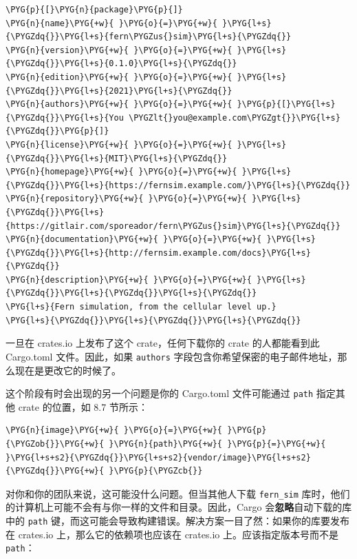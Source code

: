 \begin{Verbatim}[commandchars=\\\{\},breaklines=true,breakanywhere=true,fontsize=\codefont,xleftmargin=17bp]
\PYG{p}{[}\PYG{n}{package}\PYG{p}{]}
\PYG{n}{name}\PYG{+w}{ }\PYG{o}{=}\PYG{+w}{ }\PYG{l+s}{\PYGZdq{}}\PYG{l+s}{fern\PYGZus{}sim}\PYG{l+s}{\PYGZdq{}}
\PYG{n}{version}\PYG{+w}{ }\PYG{o}{=}\PYG{+w}{ }\PYG{l+s}{\PYGZdq{}}\PYG{l+s}{0.1.0}\PYG{l+s}{\PYGZdq{}}
\PYG{n}{edition}\PYG{+w}{ }\PYG{o}{=}\PYG{+w}{ }\PYG{l+s}{\PYGZdq{}}\PYG{l+s}{2021}\PYG{l+s}{\PYGZdq{}}
\PYG{n}{authors}\PYG{+w}{ }\PYG{o}{=}\PYG{+w}{ }\PYG{p}{[}\PYG{l+s}{\PYGZdq{}}\PYG{l+s}{You \PYGZlt{}you@example.com\PYGZgt{}}\PYG{l+s}{\PYGZdq{}}\PYG{p}{]}
\PYG{n}{license}\PYG{+w}{ }\PYG{o}{=}\PYG{+w}{ }\PYG{l+s}{\PYGZdq{}}\PYG{l+s}{MIT}\PYG{l+s}{\PYGZdq{}}
\PYG{n}{homepage}\PYG{+w}{ }\PYG{o}{=}\PYG{+w}{ }\PYG{l+s}{\PYGZdq{}}\PYG{l+s}{https://fernsim.example.com/}\PYG{l+s}{\PYGZdq{}}
\PYG{n}{repository}\PYG{+w}{ }\PYG{o}{=}\PYG{+w}{ }\PYG{l+s}{\PYGZdq{}}\PYG{l+s}{https://gitlair.com/sporeador/fern\PYGZus{}sim}\PYG{l+s}{\PYGZdq{}}
\PYG{n}{documentation}\PYG{+w}{ }\PYG{o}{=}\PYG{+w}{ }\PYG{l+s}{\PYGZdq{}}\PYG{l+s}{http://fernsim.example.com/docs}\PYG{l+s}{\PYGZdq{}}
\PYG{n}{description}\PYG{+w}{ }\PYG{o}{=}\PYG{+w}{ }\PYG{l+s}{\PYGZdq{}}\PYG{l+s}{\PYGZdq{}}\PYG{l+s}{\PYGZdq{}}
\PYG{l+s}{Fern simulation, from the cellular level up.}
\PYG{l+s}{\PYGZdq{}}\PYG{l+s}{\PYGZdq{}}\PYG{l+s}{\PYGZdq{}}
\end{Verbatim}

\begin{myNote}
一旦在 crates.io 上发布了这个 crate，任何下载你的 crate 的人都能看到此 Cargo.toml 文件。因此，如果 \texttt{authors} 字段包含你希望保密的电子邮件地址，那么现在是更改它的时候了。
\end{myNote}

这个阶段有时会出现的另一个问题是你的 Cargo.toml 文件可能通过 \texttt{path} 指定其他 crate 的位置，如 8.7 节所示：

\begin{Verbatim}[commandchars=\\\{\},breaklines=true,breakanywhere=true,fontsize=\codefont,xleftmargin=17bp]
\PYG{n}{image}\PYG{+w}{ }\PYG{o}{=}\PYG{+w}{ }\PYG{p}{\PYGZob{}}\PYG{+w}{ }\PYG{n}{path}\PYG{+w}{ }\PYG{p}{=}\PYG{+w}{ }\PYG{l+s+s2}{\PYGZdq{}}\PYG{l+s+s2}{vendor/image}\PYG{l+s+s2}{\PYGZdq{}}\PYG{+w}{ }\PYG{p}{\PYGZcb{}}
\end{Verbatim}

对你和你的团队来说，这可能没什么问题。但当其他人下载 \texttt{fern\_sim} 库时，他们的计算机上可能不会有与你一样的文件和目录。因此，Cargo 会\textbf{忽略}自动下载的库中的 \texttt{path} 键，而这可能会导致构建错误。解决方案一目了然：如果你的库要发布在 crates.io 上，那么它的依赖项也应该在 crates.io 上。应该指定版本号而不是 \texttt{path}：

